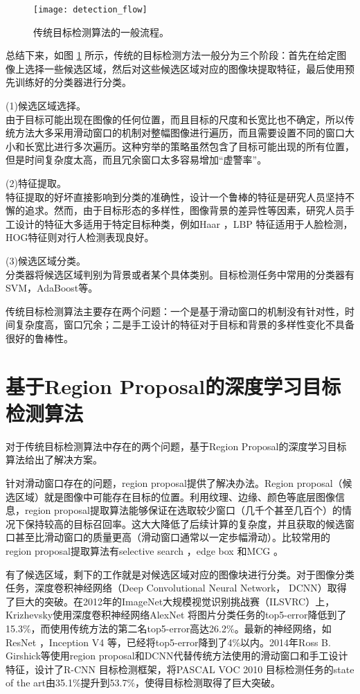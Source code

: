 \begin{figure}[!t]
	\centering
	\texttt{[image: detection\_flow]}
	\caption{传统目标检测算法的一般流程。}
	\label{detection_flow}
\end{figure}

总结下来，如图 \ref{detection_flow} 所示，传统的目标检测方法一般分为三个阶段：首先在给定图像上选择一些候选区域，然后对这些候选区域对应的图像块提取特征，最后使用预先训练好的分类器进行分类。
\begin{namelist}{}
	\item (1)候选区域选择。\\
	由于目标可能出现在图像的任何位置，而且目标的尺度和长宽比也不确定，所以传统方法大多采用滑动窗口的机制对整幅图像进行遍历，而且需要设置不同的窗口大小和长宽比进行多次遍历。这种穷举的策略虽然包含了目标可能出现的所有位置，但是时间复杂度太高，而且冗余窗口太多容易增加``虚警率''。
	\item (2)特征提取。\\
	特征提取的好坏直接影响到分类的准确性，设计一个鲁棒的特征是研究人员坚持不懈的追求。然而，由于目标形态的多样性，图像背景的差异性等因素，研究人员手工设计的特征大多适用于特定目标种类，例如Haar \cite{via-jones-face}，LBP \cite{lbp} 特征适用于人脸检测，HOG特征则对行人检测表现良好。
	\item (3)候选区域分类。\\
	分类器将候选区域判别为背景或者某个具体类别。目标检测任务中常用的分类器有SVM，AdaBoost等。
\end{namelist}
传统目标检测算法主要存在两个问题：一个是基于滑动窗口的机制没有针对性，时间复杂度高，窗口冗余；二是手工设计的特征对于目标和背景的多样性变化不具备很好的鲁棒性。

\section{基于Region Proposal的深度学习目标检测算法}
对于传统目标检测算法中存在的两个问题，基于Region Proposal的深度学习目标算法给出了解决方案。

针对滑动窗口存在的问题，region proposal提供了解决办法。Region proposal（候选区域）就是图像中可能存在目标的位置。利用纹理、边缘、颜色等底层图像信息，region proposal提取算法能够保证在选取较少窗口（几千个甚至几百个）的情况下保持较高的目标召回率。这大大降低了后续计算的复杂度，并且获取的候选窗口甚至比滑动窗口的质量更高（滑动窗口通常以一定歩幅滑动）。比较常用的region proposal提取算法有selective search \cite{selective-search}，edge box \cite{edge-box}和MCG \cite{mcg}。

有了候选区域，剩下的工作就是对候选区域对应的图像块进行分类。对于图像分类任务，深度卷积神经网络（Deep Convolutional Neural Network， DCNN）取得了巨大的突破。在2012年的ImageNet大规模视觉识别挑战赛（ILSVRC）上，Krizhevsky使用深度卷积神经网络AlexNet \cite{alexnet}将图片分类任务的top5-error降低到了15.3\%，而使用传统方法的第二名top5-error高达26.2\%。最新的神经网络，如ResNet \cite{resnet}，Inception V4 \cite{inception-v4}等，已经将top5-error降到了4\%以内。2014年Ross B. Girshick等使用region proposal和DCNN代替传统方法使用的滑动窗口和手工设计特征，设计了R-CNN \cite{rcnn}目标检测框架，将PASCAL VOC 2010 \cite{pascal-voc-2010} 目标检测任务的state of the art由35.1\%提升到53.7\%，使得目标检测取得了巨大突破。

